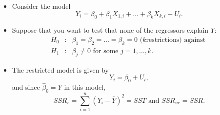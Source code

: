 \documentclass[notes=show,compress,beamer]{beamer}
\begin{document}
\begin{frame}%


\begin{itemize}
\item Consider the model%
\begin{equation*}
Y_{i}=\beta _{0}+\beta _{1}X_{1,i}+\ldots +\beta _{k}X_{k,i}+U_{i}.
\end{equation*}%
\pause%

\item Suppose that you want to test that none of the regressors explain $Y:$%
\begin{eqnarray*}
H_{0} &:&\beta _{1}=\beta _{2}=\ldots =\beta _{k}=0\text{ (}k\text{
restrictions) against } \\
H_{1} &:&\beta _{j}\neq 0\text{ for some }j=1,\ldots ,k.
\end{eqnarray*}%
\pause%

\item The restricted model is given by%
\begin{equation*}
Y_{i}=\beta _{0}+U_{i},
\end{equation*}%
and since $\hat{\beta}_{0}=\bar{Y}$ in this model,%
\begin{equation*}
SSR_{r}=\sum_{i=1}^{n}\left( Y_{i}-\bar{Y}\right) ^{2}=SST\text{ and }%
SSR_{ur}=SSR.
\end{equation*}
\end{itemize}

\end{frame}%
\end{document}

